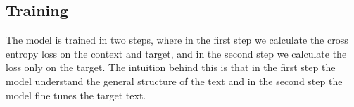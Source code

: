\subsection{Training}

The model is trained in two steps, where in the first step we calculate the cross entropy loss on the context and target,
and in the second step we calculate the loss only on the target.
The intuition behind this is that in the first step the model understand the general structure of the text
and in the second step the model fine tunes the target text.

